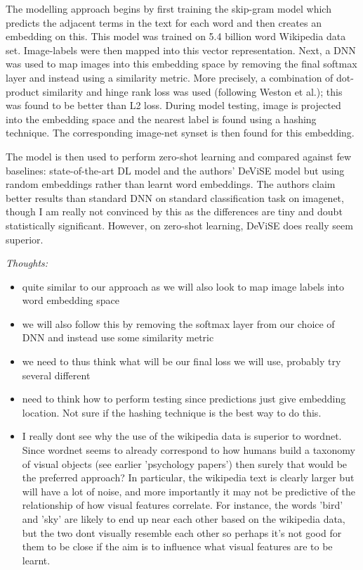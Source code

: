 \documentclass{report}
\begin{document}
The modelling approach begins by first training the skip-gram model which predicts the adjacent terms in the text for each word and then creates an embedding on this. This model was trained on 5.4 billion word Wikipedia data set. Image-labels were then mapped into this vector representation. Next, a DNN was used to map images into this embedding space by removing the final softmax layer and instead using a similarity metric. More precisely, a combination of dot-product similarity and hinge rank loss was used (following Weston et al.); this was found to be better than L2 loss. During model testing, image is projected into the embedding space and the nearest label is found using a hashing technique. The corresponding image-net synset is then found for this embedding.

The model is then used to perform zero-shot learning and compared against few baselines: state-of-the-art DL model and the authors' DeViSE model but using random embeddings rather than learnt word embeddings. The authors claim better results than standard DNN on standard classification task on imagenet, though I am really not convinced by this as the differences are tiny and doubt statistically significant. However, on zero-shot learning, DeViSE does really seem superior. 

\textit{Thoughts:}

\begin{itemize}
\item quite similar to our approach as we will also look to map image labels into word embedding space 
\item we will also follow this by removing the softmax layer from our choice of DNN and instead use some similarity metric
\item we need to thus think what will be our final loss we will use, probably try several different
\item need to think how to perform testing since predictions just give embedding location. Not sure if the hashing technique is the best way to do this. 
\item I really dont see why the use of the wikipedia data is superior to wordnet. Since wordnet seems to already correspond to how humans build a taxonomy of visual objects (see earlier 'psychology papers') then surely that would be the preferred approach? In particular, the wikipedia text is clearly larger but will have a lot of noise, and more importantly it may not be predictive of the relationship of how visual features correlate. For instance, the words 'bird' and 'sky' are likely to end up near each other based on the wikipedia data, but the two dont visually resemble each other so perhaps it's not good for them to be close if the aim is to influence what visual features are to be learnt. \\
\end{itemize}
\end{document}
